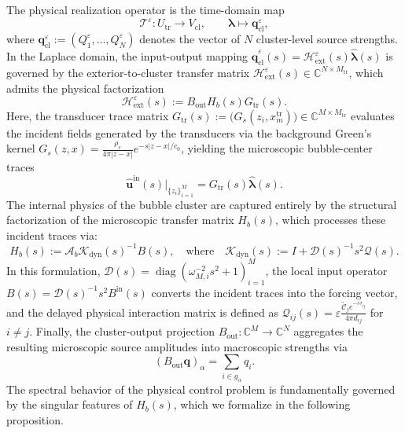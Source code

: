 \documentclass[11pt,a4paper]{article}
\numberwithin{equation}{section}
\begin{document}
\noindent
The physical realization operator is the time-domain map 
\[
  \mathcal{T}^\varepsilon : U_{\mathrm{tr}} \longrightarrow V_{\mathrm{cl}}, \qquad \boldsymbol{\lambda} \longmapsto \mathbf{q}_{\mathrm{cl}}^\varepsilon,
\]
where $\mathbf{q}_{\mathrm{cl}}^\varepsilon := (Q_1^\varepsilon, \dots, Q_N^\varepsilon)$ denotes the vector of $N$ cluster-level source strengths. In the Laplace domain, the input-output mapping $\widehat{\mathbf{q}}_{\mathrm{cl}}^\varepsilon(s) = \mathcal{H}_{\mathrm{ext}}^\varepsilon(s)\widehat{\boldsymbol{\lambda}}(s)$ is governed by the exterior-to-cluster transfer matrix $\mathcal{H}_{\mathrm{ext}}^\varepsilon(s) \in \mathbb{C}^{N\times M_{\mathrm{tr}}}$, which admits the physical factorization
\begin{equation}
  \mathcal{H}_{\mathrm{ext}}^\varepsilon(s) := B_{\mathrm{out}} H_b(s) G_{\mathrm{tr}}(s).
\end{equation}
Here, the transducer trace matrix $G_{\mathrm{tr}}(s) := \bigl(G_s(z_i,x_m^{\mathrm{tr}})\bigr) \in \mathbb{C}^{M \times M_{\mathrm{tr}}}$ evaluates the incident fields generated by the transducers via the background Green's kernel $G_s(z,x) = \frac{\rho_c}{4\pi |z-x|} e^{-s|z-x|/c_0}$, yielding the microscopic bubble-center traces
\begin{equation}
\label{eq:incident-traces-transducers}
  \widehat{\mathbf{u}}^{\mathrm{in}}(s)\big|_{\{z_i\}_{i=1}^M} = G_{\mathrm{tr}}(s)\widehat{\boldsymbol{\lambda}}(s).
\end{equation}
The internal physics of the bubble cluster are captured entirely by the structural factorization of the microscopic transfer matrix $H_b(s)$, which processes these incident traces via:
\begin{equation}
\label{eq:Hb-definition}
  H_b(s) := \mathcal{A}_b \mathcal{K}_{\mathrm{dyn}}(s)^{-1} B(s), \quad \text{where} \quad \mathcal{K}_{\mathrm{dyn}}(s) := I + \mathcal{D}(s)^{-1} s^2 \mathcal{Q}(s).
\end{equation}
In this formulation, $\mathcal{D}(s) = \operatorname{diag}(\omega_{M,i}^{-2} s^2 + 1)_{i=1}^M$, the local input operator $B(s) = \mathcal{D}(s)^{-1} s^2 B^{\mathrm{in}}(s)$ converts the incident traces into the forcing vector, and the delayed physical interaction matrix is defined as $\mathcal{Q}_{ij}(s) = \varepsilon\frac{\widetilde{\mathcal{C}}_j e^{-s\tau_{ij}}}{4\pi d_{ij}}$ for $i \neq j$. Finally, the cluster-output projection $B_{\mathrm{out}} : \mathbb{C}^M \to \mathbb{C}^N$ aggregates the resulting microscopic source amplitudes into macroscopic strengths via
\[
  (B_{\mathrm{out}}\mathbf{q})_\alpha = \sum_{i \in g_\alpha} q_i.
\]
\noindent
The spectral behavior of the physical control problem is fundamentally governed by the singular features of $H_b(s)$, which we formalize in the following proposition.
\end{document}
